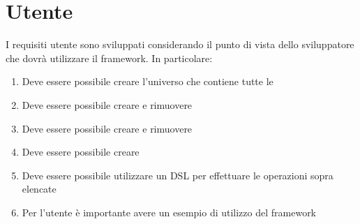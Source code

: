 \section{Utente}\label{sec:utente}
I requisiti utente sono sviluppati considerando il punto di vista dello sviluppatore che dovrà utilizzare il framework.
In particolare:
\begin{enumerate}[label=\textbf{\ref{sec:utente}.\arabic*}]
    \item \label{itm:u1} Deve essere possibile creare l'universo che contiene tutte le \Entity
    \item \label{itm:u2} Deve essere possibile creare e rimuovere \Component
    \item \label{itm:u3} Deve essere possibile creare e rimuovere \Entity
    \item \label{itm:u4} Deve essere possibile creare \System
    \item \label{itm:u5} Deve essere possibile utilizzare un DSL per effettuare le operazioni sopra elencate
    \item \label{itm:u6} Per l'utente è importante avere un esempio di utilizzo del framework
\end{enumerate}

